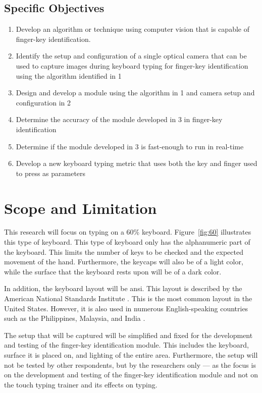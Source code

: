 \documentclass{report}
\begin{document}
\subsection{Specific Objectives}
\begin{enumerate}
	\item Develop an algorithm or technique using computer vision that is capable
	      of finger-key identification.
	\item Identify the setup and configuration of a single optical camera that can
	      be used to capture images during keyboard typing for finger-key
	      identification using the algorithm identified in 1
	\item Design and develop a module using the algorithm in 1 and camera setup
	      and configuration in 2
	\item Determine the accuracy of the module developed in 3 in finger-key
	      identification
	\item Determine if the module developed in 3 is fast-enough to run in
	      real-time
	\item Develop a new keyboard typing metric that uses both the key and
	      finger used to press as parameters
\end{enumerate}

\section{Scope and Limitation}
This research will focus on typing on a 60\% keyboard. Figure~\ref{fig:60}
illustrates this type of keyboard. This type of keyboard only has the
alphanumeric part of the keyboard. This limits the number of keys to be checked
and the expected movement of the hand. Furthermore, the keycaps will also be of
a light color, while the surface that the keyboard rests upon will be of a dark
color.

In addition, the keyboard layout will be \ac{ansi}. This layout is described by
the American National Standards Institute \parencite{ansi}. This is the most
common layout in the United States. However, it is also used in numerous
English-speaking countries such as the Philippines, Malaysia, and India
\parencite{apple-layout}.

The setup that will be captured will be simplified and fixed for the development
and testing of the finger-key identification module. This includes the
keyboard, surface it is placed on, and lighting of the entire area. Furthermore,
the setup will not be tested by other respondents, but by the researchers only
--- as the focus is on the development and testing of the finger-key
identification module and not on the touch typing trainer and its effects on
typing.
\end{document}
